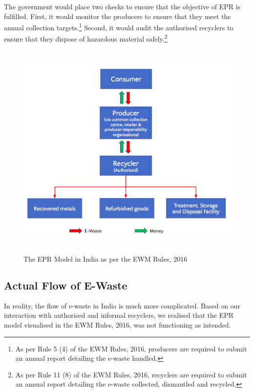 \documentclass[a4paper, 12pt]{article}
\begin{document}
                    The government would place two checks to ensure that the objective of EPR is fulfilled. First, it would monitor the producers to ensure that they meet the annual collection targets.\footnote{As per Rule 5 (4) of the EWM Rules, 2016, producers are required to submit an annual report detailing the e-waste handled.} Second, it would audit the authorised recyclers to ensure that they dispose of hazardous material safely.\footnote{As per Rule 11 (8) of the EWM Rules, 2016, recyclers are required to submit an annual report detailing the e-waste collected, dismantled and recycled.}\\
                    
\begin{figure}[H] %
\centering
\includegraphics[height = 4.3in]{fig1.png}
\caption[Optional Caption]{The EPR Model in India as per the EWM Rules, 2016}
\end{figure}
                    
\subsection{Actual Flow of E-Waste}
                    
                    In reality, the flow of e-waste in India is much more complicated. Based on our interaction with authorised and informal recyclers, we realised that the EPR model visualised in the EWM Rules, 2016, was not functioning as intended.\\ 
                    
\end{document}
